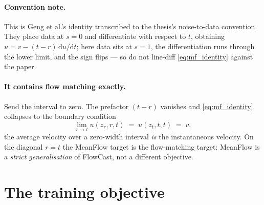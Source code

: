\documentclass[11pt]{article}
\newcommand{\dd}{\mathrm{d}}
\begin{document}
\paragraph{Convention note.} This is Geng et al.'s identity transcribed to the
thesis's noise-to-data convention. They place data at $s=0$ and differentiate
with respect to $t$, obtaining $u=v-(t-r)\,\dd u/\dd t$; here data sits at $s=1$,
the differentiation runs through the lower limit, and the sign flips --- so do
not line-diff \eqref{eq:mf_identity} against the paper.

\paragraph{It contains flow matching exactly.}
Send the interval to zero. The prefactor $(t-r)$ vanishes and
\eqref{eq:mf_identity} collapses to the boundary condition
\begin{equation}
  \lim_{r\to t} u(z_r,r,t) \;=\; u(z_t,t,t) \;=\; v ,
  \label{eq:mf_boundary}
\end{equation}
the average velocity over a zero-width interval \emph{is} the instantaneous
velocity. On the diagonal $r=t$ the MeanFlow target is the flow-matching target:
MeanFlow is a \emph{strict generalisation} of FlowCast, not a different
objective.

\section{The training objective}
\end{document}
